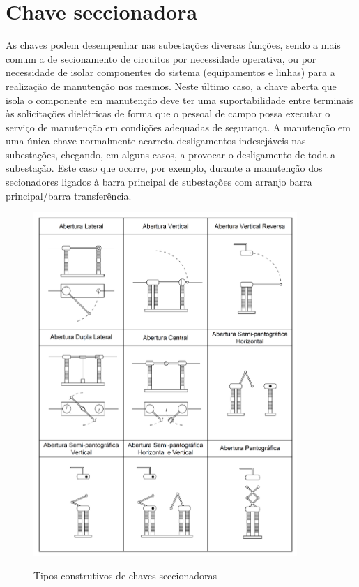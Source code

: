 \documentclass[a5paper,english,spanish,brazil]{ufsc-thesis}
\begin{document}
\section{Chave seccionadora}
As chaves podem desempenhar nas subestações diversas funções, sendo a mais comum a de secionamento de circuitos por necessidade operativa, ou por necessidade de isolar componentes do sistema (equipamentos e linhas) para a realização de manutenção nos mesmos. Neste último caso, a chave aberta que isola o componente em manutenção deve ter uma suportabilidade entre terminais às solicitações dielétricas de forma que o pessoal de campo possa executar o serviço de manutenção em condições adequadas de segurança. A manutenção em uma única chave normalmente acarreta desligamentos indesejáveis nas subestações, chegando, em alguns casos, a provocar o desligamento de toda a subestação. Este caso que ocorre, por exemplo, durante a manutenção dos secionadores ligados à barra principal de subestações com arranjo barra principal/barra transferência.

\begin{figure}[htb]
  \caption{Tipos construtivos de chaves seccionadoras}
  \centering
  \includegraphics[width=10cm]{chavesec.pdf}
  \label{fig:chavesec}
\end{figure}
\end{document}
